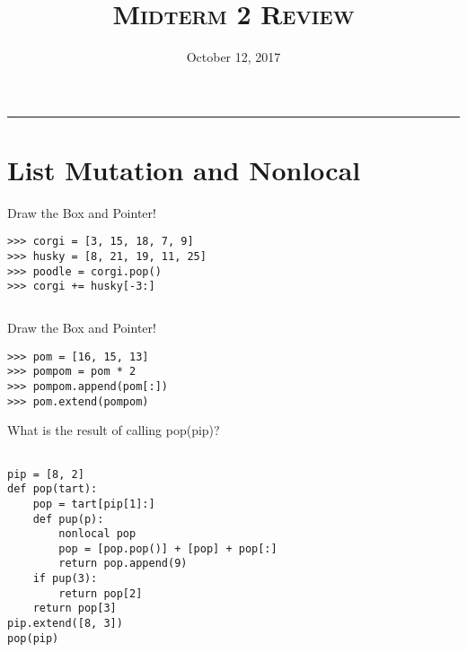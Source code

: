 \documentclass{exam}
\title{\textsc{Midterm 2 Review}}
\date{October 12, 2017}
\begin{document}
\maketitle
\rule{\textwidth}{0.15em}
\fontsize{12}{15}\selectfont




\section{List Mutation and Nonlocal}
\begin{questions}

\item Draw the Box and Pointer!
\newline
\begin{lstlisting}
>>> corgi = [3, 15, 18, 7, 9]
>>> husky = [8, 21, 19, 11, 25]
>>> poodle = corgi.pop()
>>> corgi += husky[-3:]
\end{lstlisting}
\begin{solution}
\begin{lstlisting}

\end{lstlisting}
\end{solution}
\vspace{4cm}

\item Draw the Box and Pointer!

\begin{lstlisting}
>>> pom = [16, 15, 13]
>>> pompom = pom * 2
>>> pompom.append(pom[:])
>>> pom.extend(pompom)
\end{lstlisting}

\clearpage
\vspace{4cm}
\item What is the result of calling pop(pip)?

\begin{lstlisting}

pip = [8, 2]
def pop(tart):
    pop = tart[pip[1]:]
    def pup(p):
        nonlocal pop
        pop = [pop.pop()] + [pop] + pop[:] 
        return pop.append(9)
    if pup(3):
        return pop[2]
    return pop[3]
pip.extend([8, 3])
pop(pip)
\end{lstlisting}

\end{questions}
\clearpage
\end{document}
